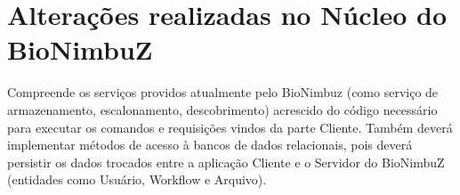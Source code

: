 \begin{table}[H]
\centering
{}
\caption{Relação entre classes Java e páginas \textit{HTML}.}
\label{tab:classes_java_rest}
\end{table}


\section{Alterações realizadas no Núcleo do BioNimbuZ} \label{cap5sec6}
    
Compreende os serviços providos atualmente pelo BioNimbuz (como serviço de armazenamento, escalonamento, descobrimento) acrescido do código necessário para executar os comandos e requisições vindos da parte Cliente. Também deverá implementar métodos de acesso à bancos de dados relacionais, pois deverá persistir os dados trocados entre a aplicação Cliente e o Servidor do BioNimbuZ (entidades como Usuário, Workflow e Arquivo).

